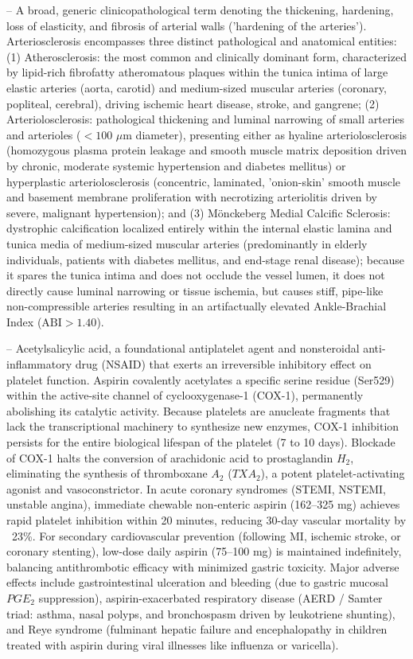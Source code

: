 -- A broad, generic clinicopathological term denoting the thickening, hardening, loss of elasticity, and fibrosis of arterial walls ('hardening of the arteries'). Arteriosclerosis encompasses three distinct pathological and anatomical entities: (1) Atherosclerosis: the most common and clinically dominant form, characterized by lipid-rich fibrofatty atheromatous plaques within the tunica intima of large elastic arteries (aorta, carotid) and medium-sized muscular arteries (coronary, popliteal, cerebral), driving ischemic heart disease, stroke, and gangrene; (2) Arteriolosclerosis: pathological thickening and luminal narrowing of small arteries and arterioles ($<100$ $\mu$m diameter), presenting either as hyaline arteriolosclerosis (homozygous plasma protein leakage and smooth muscle matrix deposition driven by chronic, moderate systemic hypertension and diabetes mellitus) or hyperplastic arteriolosclerosis (concentric, laminated, 'onion-skin' smooth muscle and basement membrane proliferation with necrotizing arteriolitis driven by severe, malignant hypertension); and (3) Mönckeberg Medial Calcific Sclerosis: dystrophic calcification localized entirely within the internal elastic lamina and tunica media of medium-sized muscular arteries (predominantly in elderly individuals, patients with diabetes mellitus, and end-stage renal disease); because it spares the tunica intima and does not occlude the vessel lumen, it does not directly cause luminal narrowing or tissue ischemia, but causes stiff, pipe-like non-compressible arteries resulting in an artifactually elevated Ankle-Brachial Index ($\text{ABI} > 1.40$).

-- Acetylsalicylic acid, a foundational antiplatelet agent and nonsteroidal anti-inflammatory drug (NSAID) that exerts an irreversible inhibitory effect on platelet function. Aspirin covalently acetylates a specific serine residue (Ser529) within the active-site channel of cyclooxygenase-1 (COX-1), permanently abolishing its catalytic activity. Because platelets are anucleate fragments that lack the transcriptional machinery to synthesize new enzymes, COX-1 inhibition persists for the entire biological lifespan of the platelet (7 to 10 days). Blockade of COX-1 halts the conversion of arachidonic acid to prostaglandin $H_2$, eliminating the synthesis of thromboxane $A_2$ ($TXA_2$), a potent platelet-activating agonist and vasoconstrictor. In acute coronary syndromes (STEMI, NSTEMI, unstable angina), immediate chewable non-enteric aspirin (162--325 mg) achieves rapid platelet inhibition within 20 minutes, reducing 30-day vascular mortality by ~23\%. For secondary cardiovascular prevention (following MI, ischemic stroke, or coronary stenting), low-dose daily aspirin (75--100 mg) is maintained indefinitely, balancing antithrombotic efficacy with minimized gastric toxicity. Major adverse effects include gastrointestinal ulceration and bleeding (due to gastric mucosal $PGE_2$ suppression), aspirin-exacerbated respiratory disease (AERD / Samter triad: asthma, nasal polyps, and bronchospasm driven by leukotriene shunting), and Reye syndrome (fulminant hepatic failure and encephalopathy in children treated with aspirin during viral illnesses like influenza or varicella).

